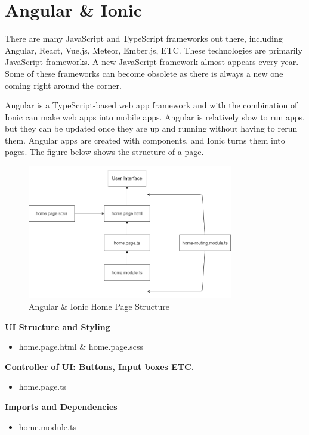 \section{Angular \& Ionic}
There are many JavaScript and TypeScript frameworks out there, including Angular, React, Vue.js, Meteor, Ember.js, ETC. These technologies are primarily JavaScript frameworks. A new JavaScript framework almost appears every year. Some of these frameworks can become obsolete as there is always a new one coming right around the corner.

Angular is a TypeScript-based web app framework and with the combination of Ionic can make web apps into mobile apps. Angular is relatively slow to run apps, but they can be updated once they are up and running without having to rerun them. Angular apps are created with components, and Ionic turns them into pages. The figure below shows the structure of a page.

\begin{figure}[H]
    \caption{Angular \& Ionic Home Page Structure}
    \label{image:ngHomePage}
    \centering
    \includegraphics[width=0.8\textwidth]{images/misc/ng-homepage.png}
\end{figure}

\textbf{UI Structure and Styling}
\begin{itemize}
    \item home.page.html \& home.page.scss
\end{itemize} 

\textbf{Controller of UI: Buttons, Input boxes ETC.}
\begin{itemize}
    \item home.page.ts 
\end{itemize} 

\textbf{Imports and Dependencies}
\begin{itemize}
    \item home.module.ts
\end{itemize} 

